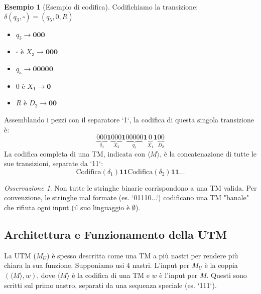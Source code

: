 \documentclass[a4paper]{article}
\theoremstyle{definition} %
\newtheorem{example}{Esempio}
\newcommand{\blankS}{\ensuremath{\square}}
\theoremstyle{remark} %
\newtheorem{remark}{Osservazione}
\begin{document}
\begin{example}[Esempio di codifica]
Codifichiamo la transizione: $\delta(q_3, \blankS) = (q_5, 0, R)$
\begin{itemize}
    \item $q_3 \rightarrow \textbf{000}$
    \item $\blankS$ è $X_3 \rightarrow \textbf{000}$
    \item $q_5 \rightarrow \textbf{00000}$
    \item $0$ è $X_1 \rightarrow \textbf{0}$
    \item $R$ è $D_2 \rightarrow \textbf{00}$
\end{itemize}
Assemblando i pezzi con il separatore `1`, la codifica di questa singola transizione è:
\[ \underbrace{000}_{q_3} \mathbf{1} \underbrace{000}_{X_3} \mathbf{1} \underbrace{00000}_{q_5} \mathbf{1} \underbrace{0}_{X_1} \mathbf{1} \underbrace{00}_{D_2} \]
La codifica completa di una TM, indicata con $\langle M \rangle$, è la concatenazione di tutte le sue transizioni, separate da `11`:
\[ \text{Codifica}(\delta_1) \mathbf{11} \text{Codifica}(\delta_2) \mathbf{11} \dots \]
\end{example}

\begin{remark}
Non tutte le stringhe binarie corrispondono a una TM valida. Per convenzione, le stringhe mal formate (es. `01110...`) codificano una TM "banale" che rifiuta ogni input (il suo linguaggio è $\emptyset$).
\end{remark}

\subsection{Architettura e Funzionamento della UTM}

La UTM ($M_U$) è spesso descritta come una TM a più nastri per rendere più chiara la sua funzione. Supponiamo usi 4 nastri. L'input per $M_U$ è la coppia $(\langle M \rangle, w)$, dove $\langle M \rangle$ è la codifica di una TM e $w$ è l'input per $M$. Questi sono scritti sul primo nastro, separati da una sequenza speciale (es. `111`).
\end{document}
